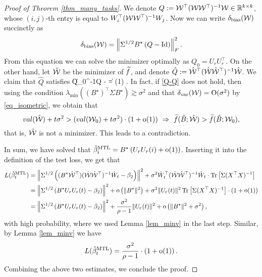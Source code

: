 \begin{proof}[Proof of Theorem \ref{thm_many_tasks}]
We denote $Q := \cal W^{\top} (\cal W\cal W^{\top})^{-1} \cal W \in\real^{k\times k}$, whose $(i,j)$-th entry is equal to $W_i^{\top} (\cal W\cal W^{\top})^{-1} W_j$.
	Now we can write $\delta_{\bias}(\cal W)$ succinctly as
	\begin{align*}
		\delta_{\bias}(\cal W)= \bignormFro{\Sigma^{1/2}B^{\star}  \bigbrace{Q -\id}}^2 .
	\end{align*}
	From this equation we can solve the minimizer optimally as $Q_0=U_{r}U_r^{\top}$. On the other hand, let $\hat {\cal W}$ be the minimizer of $\wt f$, and denote $\hat Q:= \hat{\cal W}^{\top} (\hat{\cal W}\hat{\cal W}^{\top})^{-1} \hat{\cal W} $. We claim that $\hat Q$ satisfies
	\be\label{Q-Q}\|Q_0^{-1}\hat Q - \id\| = \oo(1) \quad {}.\ee
	In fact, if \eqref{Q-Q} does not hold, then using the condition $\lambda_{\min}((B^{\star})^\top\Sigma B^{\star})\gtrsim \sigma^2$ and that $\delta_{\vari}(\cal W)=\OO(\sigma^2)$ by \eqref{eq_isometric}, we obtain that
	$$   \val(\hat {\cal W}) + t  \sigma^2 > (\val( {\cal W}_0) + t \sigma^2 )\cdot (1+\oo(1)) \ \Rightarrow \ \wt f(\hat B; \hat{\cal W})>\wt f(\hat B; {\cal W}_0),$$
	that is, $\hat {\cal W}$ is not a minimizer. This leads to a contradiction.

	In sum, we have solved that $\hat{\beta}_i^{\MTL}=B^{\star}\left( U_r U_r(i) +\oo(1)\right)$. Inserting it into the definition of the test loss, we get that
	\begin{align*}
		\te(\hat{\beta}_t^{\MTL}) &= \bignorm{\Sigma^{1/2} \left((B^\star \hat{\cal W}^\top) (\hat{\cal W}\hat{\cal W}^{\top})^{-1} \hat W_t - \beta_2 \right) }^2
		+ \sigma^2  \hat W_t^{\top} (\hat{\cal W}\hat{\cal W}^{\top})^{-1} \hat W_t \cdot \bigtr{\Sigma (X^{\top}X)^{-1}} \\
		&= \bignorm{\Sigma^{1/2} \bigbrace{B^{\star} U_r U_r(t)-\beta_2}}^2 + \oo\left(\|B^\star\|^2\right) + \sigma^2\norm{U_r(t)}^2 \bigtr{\Sigma (X^{\top}X)^{-1}} \cdot (1+\oo(1))\\
		&= \bignorm{\Sigma^{1/2} \bigbrace{B^{\star} U_r U_r(t)-\beta_2}}^2 + \frac{\sigma^2}{\rho-1}\norm{U_r(t)}^2 + \oo \left( \|B^\star\|^2 + \sigma^2\right),
	\end{align*}
	with high probability, where we used Lemma \ref{lem_minv} in the last step. Similar, by Lemma \ref{lem_minv} we have
	$$\te(\hat{\beta}_t^{\MTL})=\frac{\sigma^2}{\rho-1} \cdot \left( 1+\oo(1)\right).$$
Combining the above two estimates, we conclude the proof.
\end{proof}
